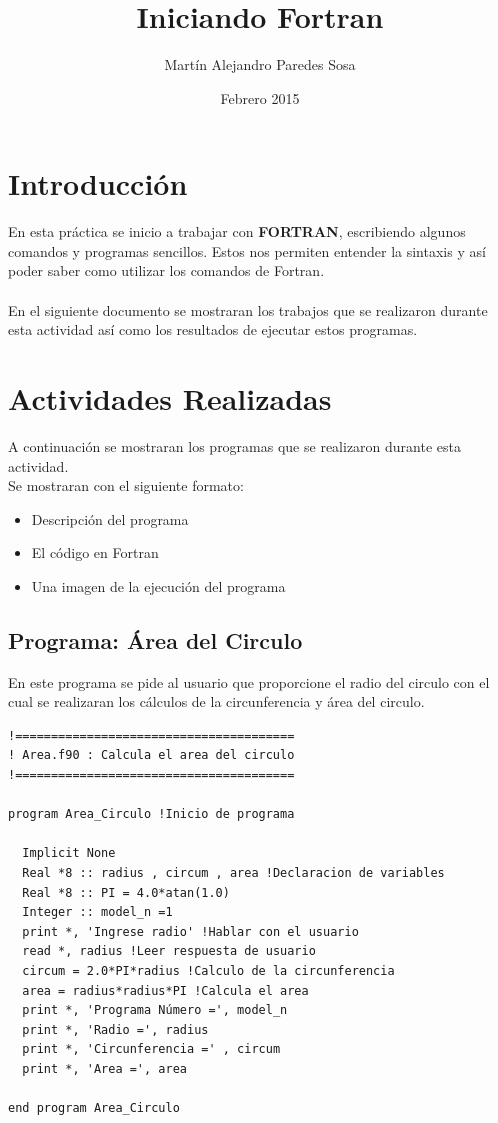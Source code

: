 \documentclass[12pt]{article}
\title{Iniciando Fortran}
\author{Martín Alejandro Paredes Sosa}
\date{Febrero 2015}
\begin{document}
\maketitle

\section{Introducción}
En esta práctica se inicio a trabajar con \textbf{FORTRAN}, escribiendo algunos comandos y programas sencillos. Estos  nos permiten entender la sintaxis y así poder saber como utilizar los comandos de Fortran.
\\ \\
En el siguiente documento se mostraran los trabajos que se realizaron durante esta actividad así como los resultados de ejecutar estos programas.
\section{Actividades Realizadas}

A continuación se mostraran los programas que se realizaron durante esta actividad.
\\
Se mostraran con el siguiente formato:

\begin{itemize}
\item Descripción del programa
\item El código en Fortran
\item Una imagen de la ejecución del programa
\end{itemize}

\pagebreak

\subsection{Programa: Área del Circulo}

En este programa se pide al usuario que proporcione el radio del circulo con el cual se realizaran los cálculos de la circunferencia y área del circulo.
\begin{verbatim}
!=======================================
! Area.f90 : Calcula el area del circulo
!=======================================

program Area_Circulo !Inicio de programa

  Implicit None
  Real *8 :: radius , circum , area !Declaracion de variables
  Real *8 :: PI = 4.0*atan(1.0)
  Integer :: model_n =1
  print *, 'Ingrese radio' !Hablar con el usuario
  read *, radius !Leer respuesta de usuario
  circum = 2.0*PI*radius !Calculo de la circunferencia
  area = radius*radius*PI !Calcula el area
  print *, 'Programa Número =', model_n
  print *, 'Radio =', radius
  print *, 'Circunferencia =' , circum
  print *, 'Area =', area

end program Area_Circulo
\end{verbatim}
\end{document}
